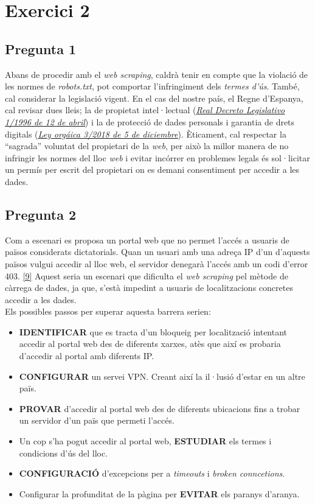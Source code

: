 \documentclass[a4paper,12pt]{report}
\begin{document}
\section*{Exercici 2}
\subsection*{Pregunta 1}
Abans de procedir amb el \textit{web scraping}, caldrà tenir en compte que la violació de les normes de \textit{robots.txt}, pot comportar l'infringiment dels \textit{termes d'ús}. També, cal considerar la legislació vigent. En el cas del nostre país, el Regne d'Espanya, cal revisar dues lleis; la de propietat intel·lectual (\href{https://www.boe.es/buscar/pdf/1996/BOE-A-1996-8930-consolidado.pdf}{\underline{\textit{Real Decreto Legislativo 1/1996 de 12 de abril}}}) i la de protecció de dades personals i garantia de drets digitals (\href{https://www.boe.es/buscar/pdf/2018/BOE-A-2018-16673-consolidado.pdf}{\underline{\textit{Ley orgáica 3/2018 de 5 de diciembre}}}). Èticament, cal respectar la ``sagrada'' voluntat del propietari de la \textit{web}, per això la millor manera de no infringir les normes del lloc \textit{web} i evitar incórrer en problemes legals és sol·licitar un permís per escrit del propietari on es demani consentiment per accedir a les dades. 
\subsection*{Pregunta 2}
Com a escenari es proposa un portal web que no permet l'accés a usuaris de països considerats dictatorials. Quan un usuari amb una adreça IP d'un d'aquests països vulgui accedir al lloc web, el servidor denegarà l'accés amb un codi d'error 403. \hyperlink{ref:biblio-http}{[9]} Aquest seria un escenari que dificulta el \textit{web scraping} pel mètode de càrrega de dades, ja que, s'està impedint a usuaris de localitzacions concretes accedir a les dades.\\
Els possibles passos per superar aquesta barrera serien:
\begin{itemize}
    \item \textbf{IDENTIFICAR} que es tracta d'un bloqueig per localització intentant accedir al portal web des de diferents xarxes, atès que així es probaria d'accedir al portal amb diferents IP.
    \item \textbf{CONFIGURAR} un servei VPN. Creant així la il·lusió d'estar en un altre païs.
    \item \textbf{PROVAR} d'accedir al portal web des de diferents ubicacions fins a trobar un servidor d'un païs que permeti l'accés.
    \item Un cop s'ha pogut accedir al portal web, \textbf{ESTUDIAR} els termes i condicions d'ús del lloc.
    \item \textbf{CONFIGURACIÓ} d'excepcions per a \textit{timeouts} i \textit{broken conncetions}.
    \item Configurar la profunditat de la pàgina per \textbf{EVITAR} els paranys d'aranya.
\end{itemize}
\end{document}
